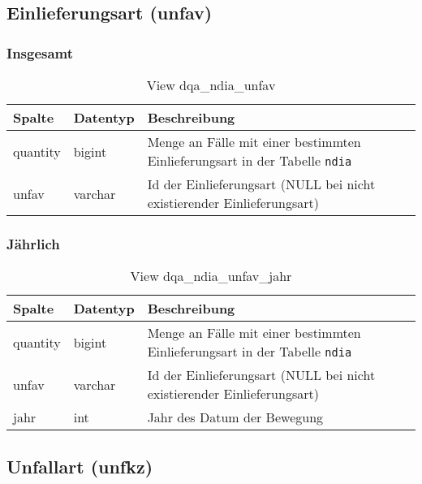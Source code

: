 \subsection{Einlieferungsart (unfav)} \label{subsec:bewUnfav}

\subsubsection{Insgesamt} \label{subsubsec:bewUnfavI}

\begin{table}[ht]
	\centering   
	\caption{View dqa\_ndia\_unfav}
	\label{tab:bewUnfavI}
	\begin{tabular}{||l|l|p{10cm}||}   		
		\hline
		Spalte & Datentyp & Beschreibung \\ [0.5ex]
		\hline\hline
		quantity & bigint & Menge an Fälle mit einer bestimmten Einlieferungsart in der Tabelle \texttt{ndia} \\
		\hline
		unfav & varchar & Id der Einlieferungsart (NULL bei nicht existierender Einlieferungsart)\\
		\hline
		
	\end{tabular}
\end{table}

\subsubsection{Jährlich} \label{subsubsec:bewUnfavJ}

\begin{table}[ht]
	\centering   
	\caption{View dqa\_ndia\_unfav\_jahr}
	\label{tab:bewUnfavJ}
	\begin{tabular}{||l|l|p{10cm}||}
		\hline
		Spalte & Datentyp & Beschreibung \\ [0.5ex]
		\hline\hline
		quantity & bigint & Menge an Fälle mit einer bestimmten Einlieferungsart in der Tabelle \texttt{ndia}\\
		\hline
		unfav & varchar & Id der Einlieferungsart (NULL bei nicht existierender Einlieferungsart)\\
		\hline
		jahr & int &  Jahr des Datum der Bewegung \\
		\hline		
	\end{tabular}
\end{table}

\subsection{Unfallart (unfkz)} \label{subsec:bewUnfkz}


